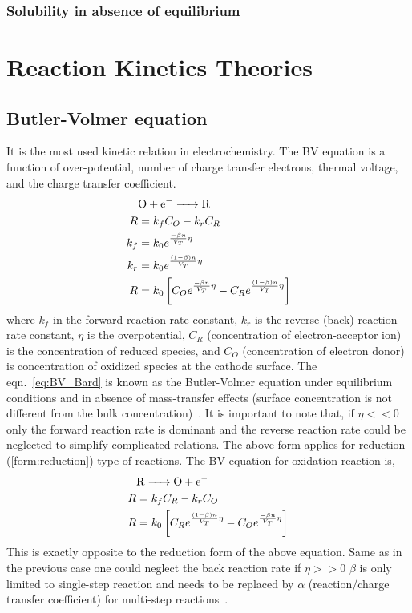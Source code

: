 \documentclass[12pt]{book}
\begin{document}
\subsection{Solubility in absence of equilibrium}
\label{section: sol_in_absec}



\chapter{Reaction Kinetics Theories}

\section{Butler-Volmer equation}
\label{sec:BV}
It is the most used kinetic relation in electrochemistry. The BV equation is a function of over-potential, number of charge transfer electrons, thermal voltage, and the charge transfer coefficient.
\begin{align}
&\ce{O + e- -> R}\label{form:reduction}\\
R&=k_fC_O-k_rC_R\nonumber\\
k_f &= k_0e^{\frac{-\beta n}{V_T}\eta}\nonumber\\
k_r &= k_0e^{\frac{(1-\beta) n}{V_T}\eta}\nonumber\\
R& = k_0\left[C_Oe^{\frac{-\beta n}{V_T}\eta} - C_Re^{\frac{(1-\beta) n}{V_T}\eta}\right]\label{eq:BV_Bard}
\end{align} 
where $k_f$ in the forward reaction rate constant, $k_r$ is the reverse (back) reaction rate constant, $\eta$ is the overpotential, $C_R$ (concentration of electron-acceptor ion) is the concentration of reduced species, and $C_O$ (concentration of electron donor) is concentration of oxidized species at the cathode surface. The eqn.~\ref{eq:BV_Bard} is known as the Butler-Volmer equation under equilibrium conditions and in absence of mass-transfer effects (surface concentration is not different from the bulk concentration)~\cite{Bard2000}. It is important to note that, if $\eta<<0$ only the forward reaction rate is dominant and the reverse reaction rate could be neglected to simplify complicated relations. 
The above form applies for reduction (\ref{form:reduction}) type of reactions. The BV equation for oxidation reaction is,
\begin{align}
&\ce{R -> O + e-}\label{form:oxidation}\\
R&=k_fC_R-k_rC_O\nonumber\\
R& = k_0\left[C_Re^{\frac{(1-\beta) n}{V_T}\eta} - C_Oe^{\frac{-\beta n}{V_T}\eta}\right]\label{eq:BV_Oxidation}
\end{align} 
This is exactly opposite to the reduction form of the above equation. Same as in the previous case one could neglect the back reaction rate if $\eta>>0$
$\beta$ is only limited to single-step reaction and needs to be replaced by $\alpha$ (reaction/charge transfer coefficient) for multi-step reactions~\cite{Bockris1973}. 
\end{document}
